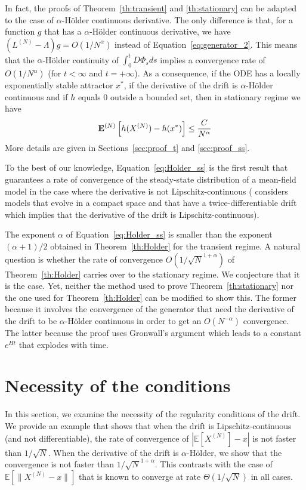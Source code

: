 \documentclass[sigconf]{acmart}
\newcommand\XN{X^{(N)}}
\newcommand\LN{L^{(N)}}
\newcommand\sesp[1]{\mathbb{E}[#1]}
\newcommand\espN[1]{{\mathchoice{\bespN{#1}}{\sespN{#1}}{\sespN{#1}}{\sespN{#1}}}}
\newcommand\bespN[1]{\mathbf{E}^{(N)}\left[#1\right]}
\newcommand\sespN[1]{\mathbf{E}^{(N)}[#1]}
\newcommand\snorm[1]{\|#1\|}
\begin{document}
In fact, the proofs of Theorem~\ref{th:transient} and
\ref{th:stationary} can be adapted to the case of $\alpha$-Hölder
continuous derivative. The only difference is that, for a function $g$
that has a $\alpha$-Hölder continuous derivative, we have
$(\LN-\Lambda)g=O(1/N^\alpha)$ instead of
Equation~\eqref{eq:generator_2}. This means that the $\alpha$-Hölder
continuity of $\int_0^tD\Phi_sds$ implies a convergence rate of
$O(1/N^\alpha)$ (for $t<\infty$ and $t=+\infty$). As a consequence, if
the ODE has a locally exponentially stable attractor $x^*$, if the
derivative of the drift is $\alpha$-Hölder continuous and if $h$
equals $0$ outside a bounded set, then in stationary regime we have
\begin{align}
  \label{eq:Holder_ss}
  \espN{h(\XN)-h(x^*)} \le \frac{C}{N^\alpha}
\end{align}
More details are given in Sections~\ref{sec:proof_t} and
\ref{sec:proof_ss}.

To the best of our knowledge, Equation~\eqref{eq:Holder_ss} is the
first result that guarantees a rate of convergence of the steady-state
distribution of a mean-field model in the case where the derivative is
not Lipschitz-continuous (\cite{ying2016rate} considers models that
evolve in a compact space and that have a twice-differentiable drift
which implies that the derivative of the drift is
Lipschitz-continuous).

The exponent $\alpha$ of Equation~\eqref{eq:Holder_ss} is smaller than
the exponent $(\alpha+1)/2$ obtained in Theorem~\ref{th:Holder} for
the transient regime.  A natural question is whether the rate of
convergence $O(1/\sqrt{N}^{1+\alpha})$ of Theorem~\ref{th:Holder}
carries over to the stationary regime. We conjecture that it is the
case. 
Yet, neither the method used to prove Theorem~\ref{th:stationary} nor
the one used for Theorem~\ref{th:Holder} can be modified to show
this. The former because it involves the convergence of the generator
that need the derivative of the drift to be $\alpha$-Hölder continuous
in order to get an $O(N^{-\alpha})$ convergence. The latter because
the proof uses Gronwall's argument which leads to a constant $e^{Ht}$
that explodes with time.




\section{Necessity of the conditions}
\label{sec:numerical}

In this section, we examine the necessity of the regularity conditions
of the drift. We provide an example that shows that when the drift is
Lipschitz-continuous (and not differentiable), the rate of convergence
of $|\sesp{\XN}-x|$ is not faster than $1/\sqrt{N}$. When the
derivative of the drift is $\alpha$-Hölder, we show that the
convergence is not faster than $1/\sqrt{N}^{1+\alpha}$.  This
contrasts with the case of $\sesp{\snorm{\XN-x}}$ that is known to
converge at rate $\Theta(1/\sqrt{N})$ in all cases.
\end{document}
